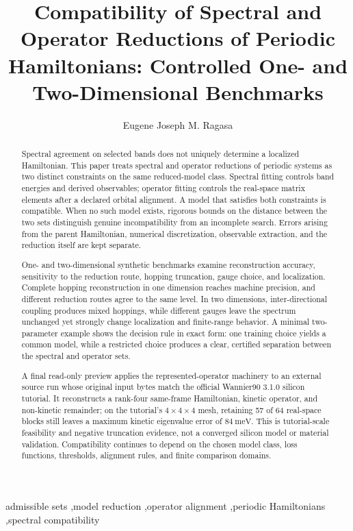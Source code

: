 \documentclass[preprint,12pt]{elsarticle}
\begin{document}
\begin{frontmatter}

\title{Compatibility of Spectral and Operator Reductions of Periodic
Hamiltonians: Controlled One- and Two-Dimensional Benchmarks}

\author[dlsu]{Eugene Joseph M. Ragasa}

\address[dlsu]{Department of Physics, De La Salle University,
Manila, Philippines}

\begin{abstract}
Spectral agreement on selected bands does not uniquely determine a localized
Hamiltonian. This paper treats spectral and operator reductions of periodic
systems as two distinct constraints on the same reduced-model class. Spectral
fitting controls band energies and derived observables; operator fitting
controls the real-space matrix elements after a declared orbital alignment. A
model that satisfies both constraints is compatible. When no such model exists,
rigorous bounds on the distance between the two sets distinguish genuine
incompatibility from an incomplete search. Errors arising from the parent
Hamiltonian, numerical discretization, observable extraction, and the reduction
itself are kept separate.

One- and two-dimensional synthetic benchmarks examine reconstruction accuracy,
sensitivity to the reduction route, hopping truncation, gauge choice, and
localization. Complete hopping reconstruction in one dimension reaches machine
precision, and different reduction routes agree to the same level. In two
dimensions, inter-directional coupling produces mixed hoppings, while different
gauges leave the spectrum unchanged yet strongly change localization and
finite-range behavior. A minimal two-parameter example shows the decision rule
in exact form: one training choice yields a common model, while a restricted
choice produces a clear, certified separation between the spectral and operator
sets.

A final read-only preview applies the represented-operator machinery to an
external source run whose original input bytes match the official Wannier90
3.1.0 silicon tutorial. It reconstructs a
rank-four same-frame Hamiltonian, kinetic operator, and non-kinetic remainder;
on the tutorial's $4\times4\times4$ mesh, retaining 57 of 64 real-space blocks
still leaves a maximum kinetic eigenvalue error of $84\ \mathrm{meV}$. This is
tutorial-scale feasibility and negative truncation evidence, not a converged
silicon model or material validation. Compatibility continues to depend on the
chosen model class, loss functions, thresholds, alignment rules, and finite
comparison domains.
\end{abstract}

\begin{keyword}
admissible sets \sep model reduction \sep operator alignment \sep periodic
Hamiltonians \sep spectral compatibility
\end{keyword}

\end{frontmatter}
\end{document}
